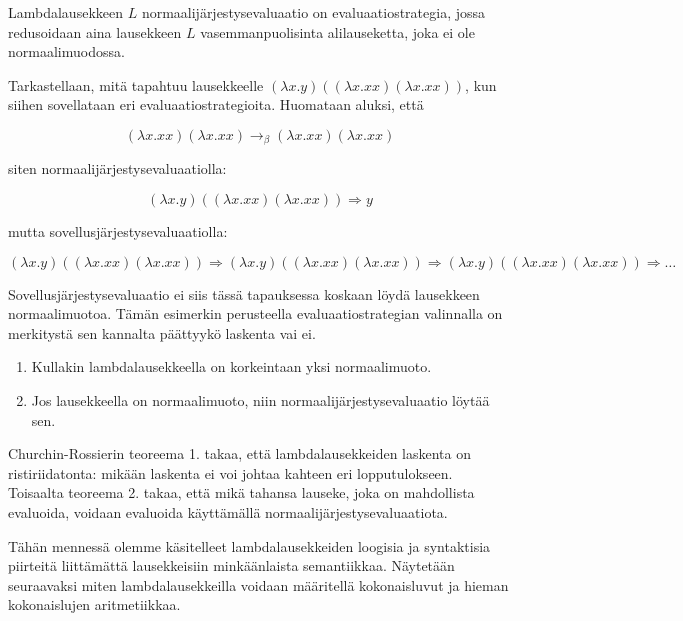 \begin{alg}[normaalijärjestysevaluaatio]
Lambdalausekkeen $L$ normaalijärjestysevaluaatio on evaluaatiostrategia, jossa redusoidaan aina lausekkeen $L$ vasemmanpuolisinta alilauseketta, joka ei ole normaalimuodossa.
\end{alg}

\begin{esim}
Tarkastellaan, mitä tapahtuu lausekkeelle $(\lambda x . y) ((\lambda x . xx) (\lambda x . xx))$, kun siihen sovellataan eri evaluaatiostrategioita. Huomataan aluksi, että  

\[ (\lambda x . xx) (\lambda x . xx) \rightarrow_{\beta} (\lambda x . xx) (\lambda x . xx) \]

siten normaalijärjestysevaluaatiolla:

\[ (\lambda x . y) ((\lambda x . xx) (\lambda x . xx)) \Longrightarrow y \]

mutta sovellusjärjestysevaluaatiolla:

\[  (\lambda x . y) ((\lambda x . xx) (\lambda x . xx)) \Longrightarrow
	(\lambda x . y) ((\lambda x . xx) (\lambda x . xx)) \Longrightarrow
	(\lambda x . y) ((\lambda x . xx) (\lambda x . xx)) \Longrightarrow \ldots \]
	
Sovellusjärjestysevaluaatio ei siis tässä tapauksessa koskaan löydä lausekkeen normaalimuotoa. Tämän esimerkin perusteella evaluaatiostrategian valinnalla on merkitystä sen kannalta päättyykö laskenta vai ei. 
\end{esim}


\begin{lau}
\begin{enumerate} $ $\newline
	\item Kullakin lambdalausekkeella on korkeintaan yksi normaalimuoto.
	\item Jos lausekkeella on normaalimuoto, niin normaalijärjestysevaluaatio löytää sen. 
\end{enumerate}
\end{lau}

Churchin-Rossierin teoreema 1. takaa, että lambdalausekkeiden laskenta on ristiriidatonta: mikään laskenta ei voi johtaa kahteen eri lopputulokseen. Toisaalta teoreema 2. takaa, että mikä tahansa lauseke, joka on mahdollista evaluoida, voidaan evaluoida käyttämällä normaalijärjestysevaluaatiota.

\par

Tähän mennessä olemme käsitelleet lambdalausekkeiden loogisia ja syntaktisia piirteitä liittämättä lausekkeisiin minkäänlaista semantiikkaa. Näytetään seuraavaksi miten lambdalausekkeilla voidaan määritellä kokonaisluvut ja hieman kokonaislujen aritmetiikkaa.
   
